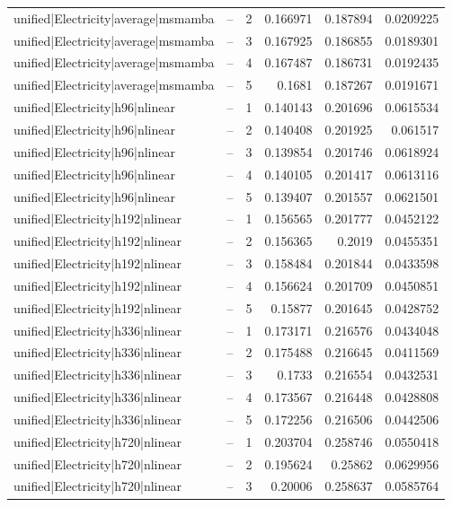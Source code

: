 \begin{longtable}{llrrrr}
unified|Electricity|average|msmamba & -- & 2 & 0.166971 & 0.187894 & 0.0209225 \\
unified|Electricity|average|msmamba & -- & 3 & 0.167925 & 0.186855 & 0.0189301 \\
unified|Electricity|average|msmamba & -- & 4 & 0.167487 & 0.186731 & 0.0192435 \\
unified|Electricity|average|msmamba & -- & 5 & 0.1681 & 0.187267 & 0.0191671 \\
unified|Electricity|h96|nlinear & -- & 1 & 0.140143 & 0.201696 & 0.0615534 \\
unified|Electricity|h96|nlinear & -- & 2 & 0.140408 & 0.201925 & 0.061517 \\
unified|Electricity|h96|nlinear & -- & 3 & 0.139854 & 0.201746 & 0.0618924 \\
unified|Electricity|h96|nlinear & -- & 4 & 0.140105 & 0.201417 & 0.0613116 \\
unified|Electricity|h96|nlinear & -- & 5 & 0.139407 & 0.201557 & 0.0621501 \\
unified|Electricity|h192|nlinear & -- & 1 & 0.156565 & 0.201777 & 0.0452122 \\
unified|Electricity|h192|nlinear & -- & 2 & 0.156365 & 0.2019 & 0.0455351 \\
unified|Electricity|h192|nlinear & -- & 3 & 0.158484 & 0.201844 & 0.0433598 \\
unified|Electricity|h192|nlinear & -- & 4 & 0.156624 & 0.201709 & 0.0450851 \\
unified|Electricity|h192|nlinear & -- & 5 & 0.15877 & 0.201645 & 0.0428752 \\
unified|Electricity|h336|nlinear & -- & 1 & 0.173171 & 0.216576 & 0.0434048 \\
unified|Electricity|h336|nlinear & -- & 2 & 0.175488 & 0.216645 & 0.0411569 \\
unified|Electricity|h336|nlinear & -- & 3 & 0.1733 & 0.216554 & 0.0432531 \\
unified|Electricity|h336|nlinear & -- & 4 & 0.173567 & 0.216448 & 0.0428808 \\
unified|Electricity|h336|nlinear & -- & 5 & 0.172256 & 0.216506 & 0.0442506 \\
unified|Electricity|h720|nlinear & -- & 1 & 0.203704 & 0.258746 & 0.0550418 \\
unified|Electricity|h720|nlinear & -- & 2 & 0.195624 & 0.25862 & 0.0629956 \\
unified|Electricity|h720|nlinear & -- & 3 & 0.20006 & 0.258637 & 0.0585764 \\

\end{longtable}
